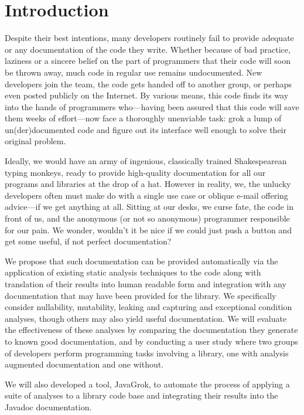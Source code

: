 \section{Introduction}

Despite their best intentions, many developers routinely fail to provide
adequate or any documentation of the code they write.  Whether because of bad
practice, laziness or a sincere belief on the part of programmers that their
code will soon be thrown away, much code in regular use remains undocumented.
New developers join the team, the code gets handed off to another group, or
perhaps even posted publicly on the Internet.  By various means, this code
finds its way into the hands of programmers who---having been assured that this
code will save them weeks of effort---now face a thoroughly unenviable task:
grok a lump of un(der)documented code and figure out its interface well enough
to solve their original problem.

Ideally, we would have an army of ingenious, classically trained Shakespearean
typing monkeys, ready to provide high-quality documentation for all our
programs and libraries at the drop of a hat.  However in reality, we, the
unlucky developers often must make do with a single use case or oblique e-mail
offering advice---if we get anything at all.  Sitting at our desks, we curse
fate, the code in front of us, and the anonymous (or not so anonymous)
programmer responsible for our pain.  We wonder, wouldn't it be nice if we
could just push a button and get some useful, if not perfect documentation?

We propose that such documentation can be provided automatically via the
application of existing static analysis techniques to the code along with
translation of their results into human readable form and integration with any
documentation that may have been provided for the library. We specifically
consider nullability, mutability, leaking and capturing and exceptional
condition analyses, though others may also yield useful documentation. We will
evaluate the effectiveness of these analyses by comparing the documentation
they generate to known good documentation, and by conducting a user study where
two groups of developers perform programming tasks involving a library, one
with analysis augmented documentation and one without.

We will also developed a tool, JavaGrok, to automate the process of applying a
suite of analyses to a library code base and integrating their results into the
Javadoc documentation.


